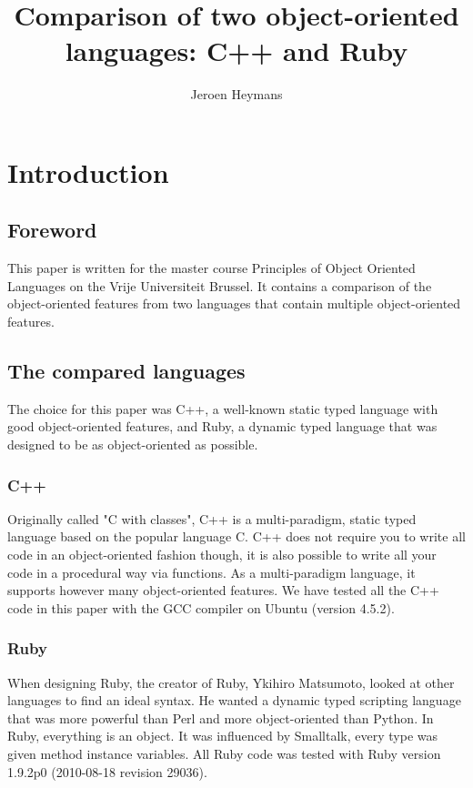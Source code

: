 \documentclass[10pt,a4paper,twocolumn]{article}
\author{Jeroen Heymans}
\title{Comparison of two object-oriented languages: C++ and Ruby}
\begin{document}
\maketitle

\tableofcontents

\section{Introduction}

\subsection{Foreword}
This paper is written for the master course Principles of Object Oriented Languages on the Vrije Universiteit Brussel. It contains a comparison of the object-oriented features from two languages that contain multiple object-oriented features. 

\subsection{The compared languages}
The choice for this paper was C++, a well-known static typed language with good object-oriented features, and Ruby, a dynamic typed language that was designed to be as object-oriented as possible.

\subsubsection{C++}
Originally called "C with classes", C++ is a multi-paradigm, static typed language based on the popular language C. C++ does not require you to write all code in an object-oriented fashion though, it is also possible to write all your code in a procedural way via functions. As a multi-paradigm language, it supports however many object-oriented features. We have tested all the C++ code in this paper with the GCC compiler on Ubuntu (version 4.5.2).

\subsubsection{Ruby}
When designing Ruby, the creator of Ruby, Ykihiro Matsumoto, looked at other languages to find an ideal syntax. He wanted a dynamic typed scripting language that was more powerful than Perl and more object-oriented than Python. In Ruby, everything is an object. It was influenced by Smalltalk, every type was given method instance variables. All Ruby code was tested with Ruby version 1.9.2p0 (2010-08-18 revision 29036).
\pagebreak
\end{document}
